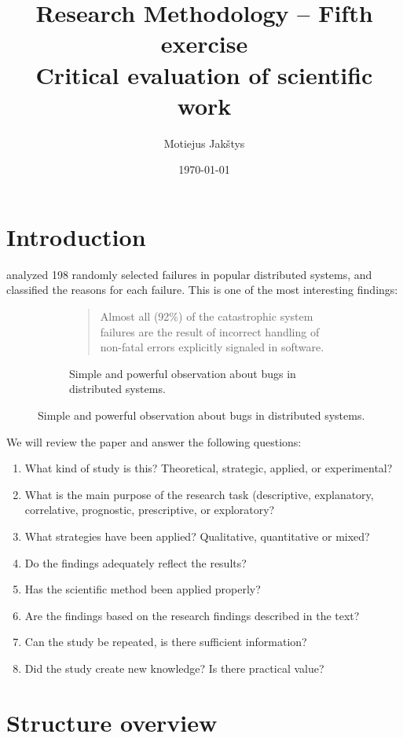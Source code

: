 \documentclass{article}
\title{
    Research Methodology -- Fifth exercise\\ \vspace{4mm}
    Critical evaluation of scientific work
}
\author{Motiejus Jakštys}
\date{\today}
\begin{document}
\maketitle

\section{Introduction}

\cite{186171} analyzed 198 randomly selected failures in popular distributed
systems, and classified the reasons for each failure. This is one of the most
interesting findings:

\begin{figure}[h]
    \centering
    \begin{subfigure}[b]{0.7\textwidth}
        \blockquote[\cite{186171}] {
            Almost all (92\%) of the catastrophic system failures are the result of
            incorrect handling of non-fatal errors explicitly signaled in software.
        }
        \caption{Simple and powerful observation about bugs in distributed systems.}
        \label{fig:quote-errors}
    \end{subfigure}
\end{figure}

We will review the paper and answer the following questions:
\begin{enumerate}
    \item What kind of study is this? Theoretical, strategic, applied, or
        experimental?
    \item What is the main purpose of the research task (descriptive,
        explanatory, correlative, prognostic, prescriptive, or exploratory?
    \item What strategies have been applied? Qualitative, quantitative or
        mixed?
    \item Do the findings adequately reflect the results?
    \item Has the scientific method been applied properly?
    \item Are the findings based on the research findings described in the
        text?
    \item Can the study be repeated, is there sufficient information?
    \item Did the study create new knowledge? Is there practical value?
\end{enumerate}


\section{Structure overview}
\end{document}
